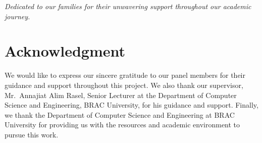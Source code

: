 \documentclass[12pt,a4paper]{report}
\begin{document}
\vspace{3cm}
\begin{center}
\textit{Dedicated to our families for their unwavering support throughout our academic journey.}
\end{center}

\newpage
\thispagestyle{empty}

\chapter*{Acknowledgment}

We would like to express our sincere gratitude to our panel members for their guidance and support throughout this project. We also thank our supervisor, Mr.\ Annajiat Alim Rasel, Senior Lecturer at the Department of Computer Science and Engineering, BRAC University, for his guidance and support. Finally, we thank the Department of Computer Science and Engineering at BRAC University for providing us with the resources and academic environment to pursue this work.

\newpage
\setcounter{page}{1}
\tableofcontents
\newpage
{}
\listoftables
\newpage
{}
\listoffigures
\newpage
\end{document}
